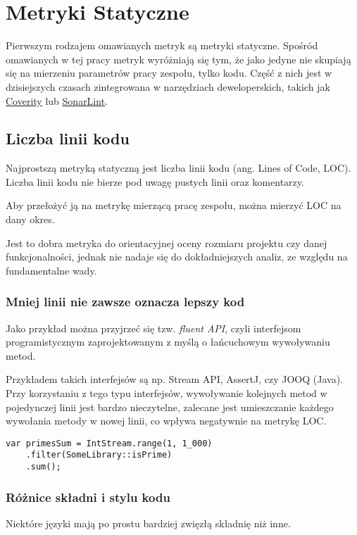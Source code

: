 \section{Metryki Statyczne}
Pierwszym rodzajem omawianych metryk są metryki statyczne. Spośród omawianych w tej pracy metryk wyróżniają się tym,
że jako jedyne nie skupiają się na mierzeniu parametrów pracy zespołu, tylko kodu.
Część z nich jest w dzisiejszych czasach zintegrowana w narzędziach deweloperskich, takich jak \href{https://www.synopsys.com/software-integrity/static-analysis-tools-sast/coverity.html}{Coverity}
lub \href{https://www.sonarsource.com/products/sonarlint/}{SonarLint}.

\subsection{Liczba linii kodu}
\label{loc}
Najprostszą metryką statyczną jest liczba linii kodu (ang. Lines of Code, LOC). Liczba linii kodu nie bierze pod uwagę pustych linii oraz komentarzy.

Aby przełożyć ją na metrykę mierzącą pracę zespołu, można mierzyć LOC na dany okres.

Jest to dobra metryka do orientacyjnej oceny rozmiaru projektu czy danej funkcjonalności, jednak nie nadaje
się do dokładniejszych analiz, ze względu na fundamentalne wady.

\subsubsection*{Mniej linii nie zawsze oznacza lepszy kod}
Jako przykład można przyjrzeć się tzw. \textit{fluent API}, czyli interfejsom programistycznym zaprojektowanym z myślą o łańcuchowym wywoływaniu metod.

Przykładem takich interfejsów są np. Stream API, AssertJ, czy JOOQ (Java).
Przy korzystaniu z tego typu interfejsów, wywoływanie kolejnych metod w pojedynczej linii jest bardzo nieczytelne, zalecane jest
umieszczanie każdego wywołania metody w nowej linii, co wpływa negatywnie na metrykę LOC.
\begin{lstlisting}[caption=Sumowanie liczb pierwszych przy użyciu Stream API (Java)]
var primesSum = IntStream.range(1, 1_000)
    .filter(SomeLibrary::isPrime)
    .sum();
\end{lstlisting}

\newpage
\subsubsection*{Różnice składni i stylu kodu}
Niektóre języki mają po prostu bardziej zwięzłą składnię niż inne.

